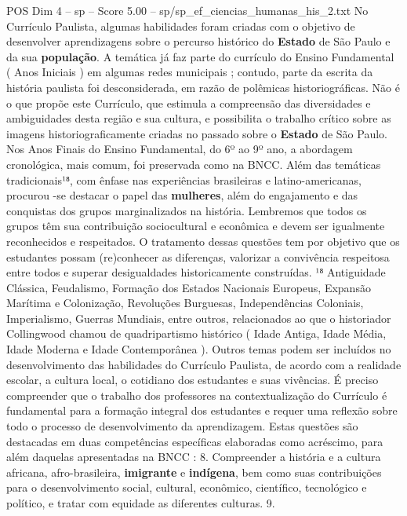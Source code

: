 \begin{textsample}{POS Dim 4 – sp – Score 5.00 – sp/sp\_ef\_ciencias\_humanas\_his\_2.txt}  \label{ex:f4_pos_259}
No Currículo Paulista, algumas habilidades foram criadas com o objetivo de desenvolver aprendizagens sobre o percurso histórico do \textbf{Estado} de São Paulo e da sua \textbf{população}.
A temática já faz parte do currículo do Ensino Fundamental ( Anos Iniciais ) em algumas redes municipais ; contudo, parte da escrita da história paulista foi desconsiderada, em razão de polêmicas historiográficas.
Não é o que propõe este Currículo, que estimula a compreensão das diversidades e ambiguidades desta região e sua cultura, e possibilita o trabalho crítico sobre as imagens historiograficamente criadas no passado sobre o \textbf{Estado} de São Paulo.
Nos Anos Finais do Ensino Fundamental, do 6º ao 9º ano, a abordagem cronológica, mais comum, foi preservada como na BNCC.
Além das temáticas tradicionais¹⁸, com ênfase nas experiências brasileiras e latino-americanas, procurou -se destacar o papel das \textbf{mulheres}, além do engajamento e das conquistas dos grupos marginalizados na história.
Lembremos que todos os grupos têm sua contribuição sociocultural e econômica e devem ser igualmente reconhecidos e respeitados.
O tratamento dessas questões tem por objetivo que os estudantes possam (re)conhecer as diferenças, valorizar a convivência respeitosa entre todos e superar desigualdades historicamente construídas. ¹⁸ Antiguidade Clássica, Feudalismo, Formação dos Estados Nacionais Europeus, Expansão Marítima e Colonização, Revoluções Burguesas, Independências Coloniais, Imperialismo, Guerras Mundiais, entre outros, relacionados ao que o historiador Collingwood chamou de quadripartismo histórico ( Idade Antiga, Idade Média, Idade Moderna e Idade Contemporânea ).
Outros temas podem ser incluídos no desenvolvimento das habilidades do Currículo Paulista, de acordo com a realidade escolar, a cultura local, o cotidiano dos estudantes e suas vivências.
É preciso compreender que o trabalho dos professores na contextualização do Currículo é fundamental para a formação integral dos estudantes e requer uma reflexão sobre todo o processo de desenvolvimento da aprendizagem.
Estas questões são destacadas em duas competências específicas elaboradas como acréscimo, para além daquelas apresentadas na BNCC : 8.
Compreender a história e a cultura africana, afro-brasileira, \textbf{imigrante} e \textbf{indígena}, bem como suas contribuições para o desenvolvimento social, cultural, econômico, científico, tecnológico e político, e tratar com equidade as diferentes culturas. 9.

\end{textsample}
